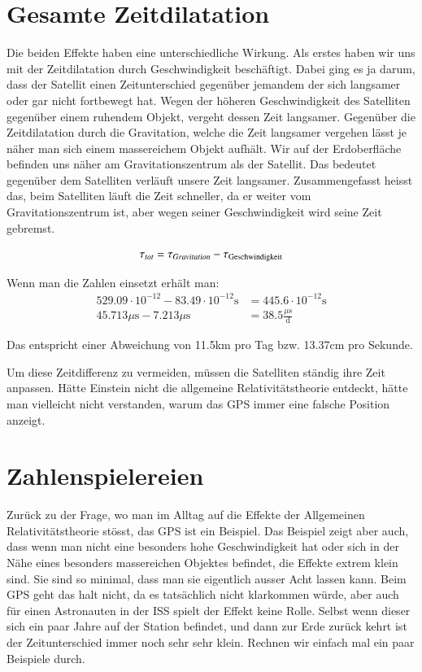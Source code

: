 \begin{refsection}
\section{Gesamte Zeitdilatation}
Die beiden Effekte haben eine unterschiedliche Wirkung. Als erstes haben wir uns mit der Zeitdilatation durch Geschwindigkeit beschäftigt. Dabei ging es ja darum, dass der Satellit einen Zeitunterschied gegenüber jemandem der sich langsamer oder gar nicht fortbewegt hat. Wegen der höheren Geschwindigkeit des Satelliten gegenüber einem ruhendem Objekt, vergeht dessen Zeit langsamer. Gegenüber die Zeitdilatation durch die Gravitation, welche die Zeit langsamer vergehen lässt je näher man sich einem massereichem Objekt aufhält. Wir auf der Erdoberfläche befinden uns näher am Gravitationszentrum als der Satellit. Das bedeutet gegenüber dem Satelliten verläuft unsere Zeit langsamer. Zusammengefasst heisst das, beim Satelliten läuft die Zeit schneller, da er weiter vom Gravitationszentrum ist, aber wegen seiner Geschwindigkeit wird seine Zeit gebremst.

\begin{equation}
\tau_{tot} = \tau_{Gravitation} - \tau_{\text{Geschwindigkeit}}\\
\end{equation}

\noindent{}Wenn man die Zahlen einsetzt erhält man:
\begin{align*}
529.09 \cdot 10^{-12} - 83.49 \cdot 10^{-12}\text{s} &= 445.6 \cdot 10^{-12}\text{s}
\\
45.713\mu{}\text{s} - 7.213\mu{}\text{s} &= 38.5\frac{\mu{}\text{s}}{\text{d}}
\end{align*}

\noindent{}Das entspricht einer Abweichung von 11.5km pro Tag bzw. 13.37cm pro Sekunde. 

Um diese Zeitdifferenz zu vermeiden, müssen die Satelliten ständig ihre Zeit anpassen. Hätte Einstein nicht die allgemeine Relativitätstheorie entdeckt, hätte man vielleicht nicht verstanden, warum das GPS immer eine falsche Position anzeigt. 

\section{Zahlenspielereien}
Zurück zu der Frage, wo man im Alltag auf die Effekte der Allgemeinen Relativitätstheorie stösst, das GPS ist ein Beispiel. Das Beispiel zeigt aber auch, dass wenn man nicht eine besonders hohe Geschwindigkeit hat oder sich in der Nähe eines besonders massereichen Objektes befindet, die Effekte extrem klein sind. Sie sind so minimal, dass man sie eigentlich ausser Acht lassen kann. Beim GPS geht das halt nicht, da es tatsächlich nicht klarkommen würde, aber auch für einen Astronauten in der ISS spielt der Effekt keine Rolle. Selbst wenn dieser sich ein paar Jahre auf der Station befindet, und dann zur Erde zurück kehrt ist der Zeitunterschied immer noch sehr sehr klein. Rechnen wir einfach mal ein paar Beispiele durch.


\end{refsection}
